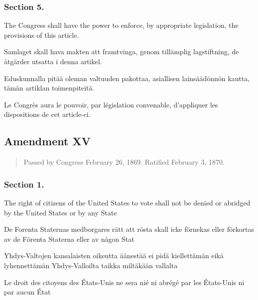 \documentclass[a4paper,landscape,12pt]{article}
\begin{document}
\subsubsection*{Section 5.}
\begin{minipage}[t]{0.22\textwidth}
The Congress shall have the power to enforce, by appropriate legislation, the provisions of this article.
\end{minipage}\textwidth
\begin{minipage}[t]{0.22\textwidth}
Samlaget skall hava makten att framtvinga, genom tillämplig lagstiftning, de åtgärder utsatta i denna artikel.
\end{minipage}\textwidth
\begin{minipage}[t]{0.22\textwidth}
Eduskunnalla pitää oleman valtuuden pakottaa, asiallisen lainsäädönnön kautta, tämän artiklan toimenpiteitä.
\end{minipage}\textwidth
\begin{minipage}[t]{0.22\textwidth}
Le Congrès aura le pouvoir, par législation convenable, d'appliquer les dispositions de cet article-ci.
\end{minipage}



\subsection*{Amendment XV}
\begin{quote}\small
	Passed by Congress February 26, 1869. Ratified February 3, 1870.
\end{quote}

\subsubsection*{Section 1.}
\begin{minipage}[t]{0.22\textwidth}
	The right of citizens of the United States to vote shall not be denied or abridged by the United States or by any State
\end{minipage}\textwidth
\begin{minipage}[t]{0.22\textwidth}
	De Forenta Staternas medborgares rätt att rösta skall icke förnekas eller förkortas av de Förenta Staterna eller av någon Stat
\end{minipage}\textwidth
\begin{minipage}[t]{0.22\textwidth}
	Yhdys-Valtojen kansalaisten oikeutta äänestää ei pidä kiellettämän eikä lyhennettämän Yhdys-Valloilta taikka miltäkään vallalta
\end{minipage}\textwidth
\begin{minipage}[t]{0.22\textwidth}
	Le droit des citoyens des États-Unis ne sera nié ni abrégé par les États-Unis ni par aucun État
\end{minipage}
\end{document}
